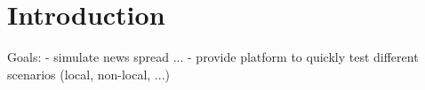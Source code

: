 \section{Introduction}

Goals:
- simulate news spread ...
- provide platform to quickly test different scenarios (local, non-local, ...)\cite{Friedkin1990}